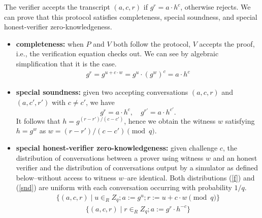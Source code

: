 \documentclass[sigconf,anonymous,review]{acmart}
\begin{document}
The verifier accepts the transcript $(a, c, r)$ if $g^r = a \cdot h^c$, otherwise rejects. We can prove that 
this protocol satisfies completeness, special soundness, and special honest-verifier 
zero-knowledgeness. 


\begin{itemize}
  \item \textbf{completeness:} when $P$ and $V$ both follow the protocol, $V$ accepts the proof, i.e., 
  the verification equation checks out. We can see by algebraic simplification that it is the case.
    \begin{align*}
      g^r = g^{u + c \cdot w} = g^u \cdot (g^w)^c = a \cdot h^c
    \end{align*}
  \item \textbf{special soundness:} given two accepting 
  conversations $(a, c, r)$ and $(a, c', r')$ with $c \neq c'$,
  we have 
  \[ g^r = a \cdot h^c, \quad g^{r'} = a \cdot h^{c'}. \]
  It follows that $h = g^{(r-r')/(c-c')}$, hence we obtain
  the witness $w$ satisfying $h=g^w$ as $w = (r - r')/(c - c') \pmod q$.

  \item \textbf{special honest-verifier zero-knowledgeness:}
   given challenge $c$, the distribution of conversations between a prover using
   witness $w$ and an honest verifier and the distribution of conversations output by a
   simulator as defined below--without access to witness $w$--are identical. Both
   distributions (\ref{f}) and (\ref{snd}) are uniform with each conversation occurring 
   with probability $1/q$.
   \begin{align}\label{f}
    \{(a, c, r) \mid u \in_{R} Z_q ; a := g^u; r := u + c \cdot w \pmod q \}
   \end{align}
   \begin{align}\label{snd}
    \{(a, c, r) \mid r \in_{R} Z_q ; a := g^r \cdot h^{-c}\}
   \end{align}
   
\end{itemize}
\end{document}

